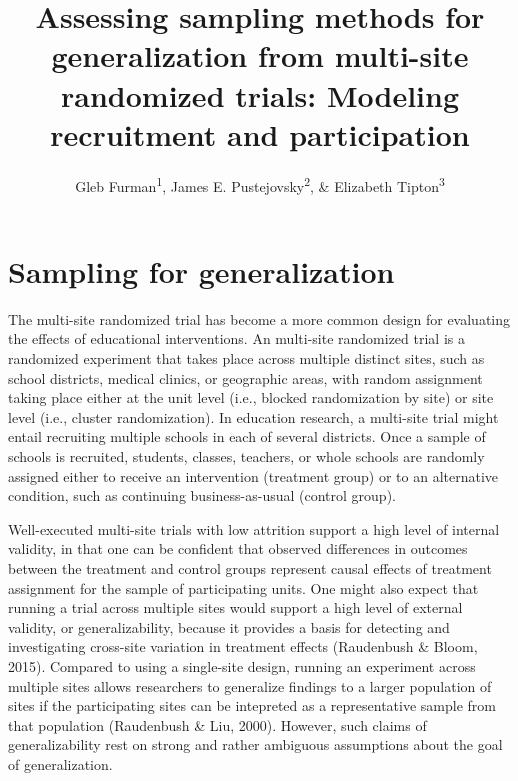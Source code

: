 \documentclass[
  man,floatsintext]{apa6}
\title{Assessing sampling methods for generalization from multi-site randomized trials: Modeling recruitment and participation}
\author{Gleb Furman\textsuperscript{1}, James E. Pustejovsky\textsuperscript{2}, \& Elizabeth Tipton\textsuperscript{3}}
\date{}
\affiliation{\vspace{0.5cm}\textsuperscript{1} University of Texas at Austin\\\textsuperscript{2} University of Wisconsin-Madison\\\textsuperscript{3} Northwestern University}
\begin{document}
\maketitle

\hypertarget{sampling-for-generalization}{%
\section*{Sampling for generalization}\label{sampling-for-generalization}}

The multi-site randomized trial has become a more common design for evaluating the effects of educational interventions. An multi-site randomized trial is a randomized experiment that takes place across multiple distinct sites, such as school districts, medical clinics, or geographic areas, with random assignment taking place either at the unit level (i.e., blocked randomization by site) or site level (i.e., cluster randomization). In education research, a multi-site trial might entail recruiting multiple schools in each of several districts. Once a sample of schools is recruited, students, classes, teachers, or whole schools are randomly assigned either to receive an intervention (treatment group) or to an alternative condition, such as continuing business-as-usual (control group).

Well-executed multi-site trials with low attrition support a high level of internal validity, in that one can be confident that observed differences in outcomes between the treatment and control groups represent causal effects of treatment assignment for the sample of participating units. One might also expect that running a trial across multiple sites would support a high level of external validity, or generalizability, because it provides a basis for detecting and investigating cross-site variation in treatment effects (Raudenbush \& Bloom, 2015). Compared to using a single-site design, running an experiment across multiple sites allows researchers to generalize findings to a larger population of sites if the participating sites can be intepreted as a representative sample from that population (Raudenbush \& Liu, 2000). However, such claims of generalizability rest on strong and rather ambiguous assumptions about the goal of generalization.
\end{document}
